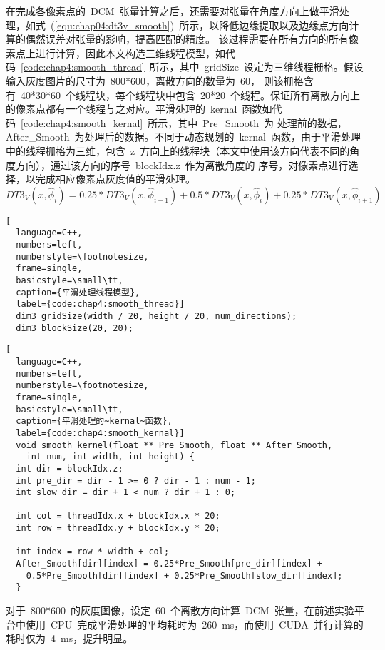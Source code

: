 在完成各像素点的~DCM~张量计算之后，还需要对张量在角度方向上做平滑处理，如式~(\ref{equ:chap04:dt3v_smooth})~所示，以降低边缘提取以及边缘点方向计算的偶然误差对张量的影响，提高匹配的精度。
该过程需要在所有方向的所有像素点上进行计算，因此本文构造三维线程模型，如代码~\ref{code:chap4:smooth_thread}~所示，其中~gridSize~设定为三维线程栅格。假设输入灰度图片的尺寸为~800*600，离散方向的数量为~60，
则该栅格含有~40*30*60~个线程块，每个线程块中包含~20*20~个线程。保证所有离散方向上的像素点都有一个线程与之对应。平滑处理的~kernal~函数如代码~\ref{code:chap4:smooth_kernal}~所示，其中~Pre\_Smooth~为
处理前的数据，After\_Smooth~为处理后的数据。不同于动态规划的~kernal~函数，由于平滑处理中的线程栅格为三维，包含~z~方向上的线程块（本文中使用该方向代表不同的角度方向），通过该方向的序号~blockIdx.z~作为离散角度的
序号，对像素点进行选择，以完成相应像素点灰度值的平滑处理。
\begin{equation}
  \label{equ:chap04:dt3v_smooth}
      DT3_V(x,\hat{\phi}_i) = 0.25 * DT3_V(x,\hat{\phi}_{i-1}) + 0.5 * DT3_V(x,\hat{\phi}_i) + 0.25 * DT3_V(x,\hat{\phi}_{i+1})
\end{equation}
\begin{lstlisting}[
  language=C++,
  numbers=left,                
  numberstyle=\footnotesize,
  frame=single,     
  basicstyle=\small\tt,    
  caption={平滑处理线程模型},
  label={code:chap4:smooth_thread}]
  dim3 gridSize(width / 20, height / 20, num_directions);
  dim3 blockSize(20, 20);
  \end{lstlisting}
\begin{lstlisting}[
  language=C++,
  numbers=left,                
  numberstyle=\footnotesize,
  frame=single,     
  basicstyle=\small\tt,    
  caption={平滑处理的~kernal~函数},
  label={code:chap4:smooth_kernal}]
  void smooth_kernel(float ** Pre_Smooth, float ** After_Smooth, 
    int num, int width, int height) {
  int dir = blockIdx.z;
  int pre_dir = dir - 1 >= 0 ? dir - 1 : num - 1;
  int slow_dir = dir + 1 < num ? dir + 1 : 0;

  int col = threadIdx.x + blockIdx.x * 20;
  int row = threadIdx.y + blockIdx.y * 20;

  int index = row * width + col;
  After_Smooth[dir][index] = 0.25*Pre_Smooth[pre_dir][index] + 
    0.5*Pre_Smooth[dir][index] + 0.25*Pre_Smooth[slow_dir][index];
  }
  \end{lstlisting}

对于~800*600~的灰度图像，设定~60~个离散方向计算~DCM~张量，在前述实验平台中使用~CPU~完成平滑处理的平均耗时为~260~ms，而使用~CUDA~并行计算的耗时仅为~4~ms，提升明显。
